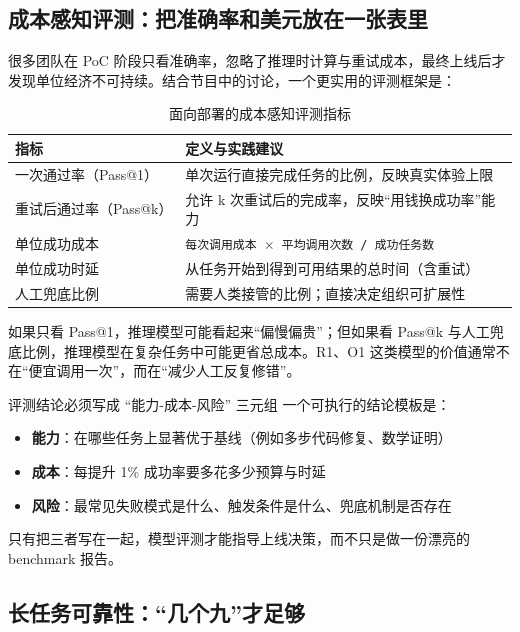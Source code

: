 \documentclass[a4paper]{article}
\begin{document}
\subsection{成本感知评测：把准确率和美元放在一张表里}

很多团队在 PoC 阶段只看准确率，忽略了推理时计算与重试成本，最终上线后才发现单位经济不可持续。结合节目中的讨论，一个更实用的评测框架是：

\begin{table}[H]
\centering
\begin{tabular}{lp{9cm}}
\toprule
\textbf{指标} & \textbf{定义与实践建议} \\
\midrule
一次通过率（Pass@1） & 单次运行直接完成任务的比例，反映真实体验上限 \\
重试后通过率（Pass@k） & 允许 k 次重试后的完成率，反映``用钱换成功率''能力 \\
单位成功成本 & \texttt{每次调用成本 $\times$ 平均调用次数 / 成功任务数} \\
单位成功时延 & 从任务开始到得到可用结果的总时间（含重试） \\
人工兜底比例 & 需要人类接管的比例；直接决定组织可扩展性 \\
\bottomrule
\end{tabular}
\caption{面向部署的成本感知评测指标}
\end{table}

如果只看 Pass@1，推理模型可能看起来``偏慢偏贵''；但如果看 Pass@k 与人工兜底比例，推理模型在复杂任务中可能更省总成本。R1、O1 这类模型的价值通常不在``便宜调用一次''，而在``减少人工反复修错''。

\begin{importantbox}{评测结论必须写成 ``能力-成本-风险'' 三元组}
一个可执行的结论模板是：
\begin{itemize}
    \item \textbf{能力}：在哪些任务上显著优于基线（例如多步代码修复、数学证明）
    \item \textbf{成本}：每提升 1\% 成功率要多花多少预算与时延
    \item \textbf{风险}：最常见失败模式是什么、触发条件是什么、兜底机制是否存在
\end{itemize}

只有把三者写在一起，模型评测才能指导上线决策，而不只是做一份漂亮的 benchmark 报告。
\end{importantbox}

\subsection{长任务可靠性：``几个九''才足够}
\end{document}
